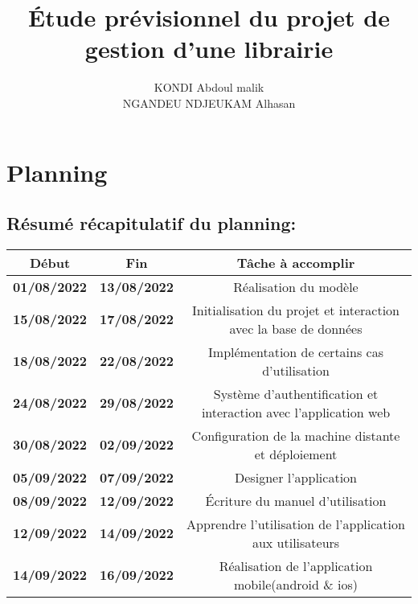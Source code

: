 \documentclass[12pt,a4paper]{article}
\author{KONDI Abdoul malik \\ NGANDEU NDJEUKAM Alhasan}
\title{Étude prévisionnel du projet de gestion d'une librairie}
\begin{document}
\maketitle
\tableofcontents
\newpage

\section{Planning}


\subsection{Résumé récapitulatif du planning:}
\begin{flushleft}

\begin{tabular}{|c|c|c|}
\hline 
Début & Fin & Tâche à accomplir \\ 
\hline 
\textbf{01/08/2022} & \textbf{13/08/2022} & Réalisation du modèle \\ 
\hline 
\textbf{15/08/2022} & \textbf{17/08/2022} & Initialisation du projet et interaction avec la base de données \\ 
\hline
\textbf{18/08/2022} & \textbf{22/08/2022} & Implémentation de certains cas d'utilisation \\ 
\hline 
\textbf{24/08/2022} & \textbf{29/08/2022} & Système d'authentification et interaction avec l'application web\\ 
\hline
\textbf{30/08/2022} & \textbf{02/09/2022} & Configuration de la machine distante et déploiement\\ 
\hline 
\textbf{05/09/2022} & \textbf{07/09/2022} & Designer l'application \\ 
\hline 
\textbf{08/09/2022} & \textbf{12/09/2022} & Écriture du manuel d'utilisation \\ 
\hline
\textbf{12/09/2022} & \textbf{14/09/2022} & Apprendre l'utilisation de l'application aux utilisateurs \\ 
\hline  
\textbf{14/09/2022} & \textbf{16/09/2022} & Réalisation de l'application mobile(android \& ios) \\ 
\hline 
 

\end{tabular} 
\end{flushleft}
\end{document}
